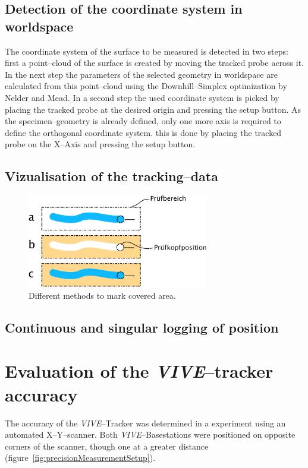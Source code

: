 \documentclass{VRARWorkshop}
\begin{document}
\subsection{Detection of the coordinate system in worldspace}
The coordinate system of the surface to be measured is detected in two steps:
first a point--cloud of the surface is created by moving the tracked probe across it.
In the next step the parameters of the selected geometry in worldspace are calculated from this point--cloud using the Downhill--Simplex optimization by Nelder and Mead.
In a second step the used coordinate system is picked by placing the tracked probe at the desired origin and pressing the setup button.
As the specimen--geometry is already defined, only one more axis is required to define the orthogonal coordinate system.
this is done by placing the tracked probe on the X--Axis and pressing the setup button.

\subsection{Vizualisation of the tracking--data}

\begin{figure}[h!]
    \begin{center}
        \includegraphics[width=79mm]{images/DrawVsErase.eps}
        \caption{\label{fig:DrawVsErase} Different methods to mark covered area.}
    \end{center}
\end{figure}

\subsection{Continuous and singular logging of position}

\section{Evaluation of the \textit{VIVE}--tracker accuracy}
The accuracy of the \textit{VIVE}--Tracker was determined in a experiment using an automated X--Y--scanner.
Both \textit{VIVE}--Basestations were positioned on opposite corners of the scanner, though one at a greater distance (figure~\ref{fig:precisionMeasurementSetup}).
\end{document}
